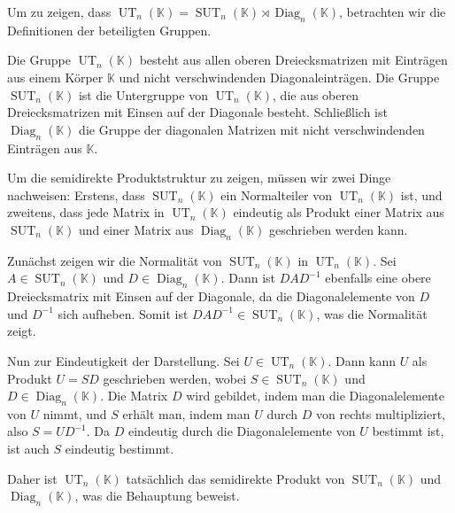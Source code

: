 Um zu zeigen, dass $\operatorname{UT}_n(\mathbb{K}) = \operatorname{SUT}_n(\mathbb{K}) \rtimes \operatorname{Diag}_n(\mathbb{K})$, betrachten wir die Definitionen der beteiligten Gruppen.

Die Gruppe $\operatorname{UT}_n(\mathbb{K})$ besteht aus allen oberen Dreiecksmatrizen mit Einträgen aus einem Körper $\mathbb{K}$ und nicht verschwindenden Diagonaleinträgen. Die Gruppe $\operatorname{SUT}_n(\mathbb{K})$ ist die Untergruppe von $\operatorname{UT}_n(\mathbb{K})$, die aus oberen Dreiecksmatrizen mit Einsen auf der Diagonale besteht. Schließlich ist $\operatorname{Diag}_n(\mathbb{K})$ die Gruppe der diagonalen Matrizen mit nicht verschwindenden Einträgen aus $\mathbb{K}$.

Um die semidirekte Produktstruktur zu zeigen, müssen wir zwei Dinge nachweisen: Erstens, dass $\operatorname{SUT}_n(\mathbb{K})$ ein Normalteiler von $\operatorname{UT}_n(\mathbb{K})$ ist, und zweitens, dass jede Matrix in $\operatorname{UT}_n(\mathbb{K})$ eindeutig als Produkt einer Matrix aus $\operatorname{SUT}_n(\mathbb{K})$ und einer Matrix aus $\operatorname{Diag}_n(\mathbb{K})$ geschrieben werden kann.

Zunächst zeigen wir die Normalität von $\operatorname{SUT}_n(\mathbb{K})$ in $\operatorname{UT}_n(\mathbb{K})$. Sei $A \in \operatorname{SUT}_n(\mathbb{K})$ und $D \in \operatorname{Diag}_n(\mathbb{K})$. Dann ist $DAD^{-1}$ ebenfalls eine obere Dreiecksmatrix mit Einsen auf der Diagonale, da die Diagonalelemente von $D$ und $D^{-1}$ sich aufheben. Somit ist $DAD^{-1} \in \operatorname{SUT}_n(\mathbb{K})$, was die Normalität zeigt.

Nun zur Eindeutigkeit der Darstellung. Sei $U \in \operatorname{UT}_n(\mathbb{K})$. Dann kann $U$ als Produkt $U = SD$ geschrieben werden, wobei $S \in \operatorname{SUT}_n(\mathbb{K})$ und $D \in \operatorname{Diag}_n(\mathbb{K})$. Die Matrix $D$ wird gebildet, indem man die Diagonalelemente von $U$ nimmt, und $S$ erhält man, indem man $U$ durch $D$ von rechts multipliziert, also $S = UD^{-1}$. Da $D$ eindeutig durch die Diagonalelemente von $U$ bestimmt ist, ist auch $S$ eindeutig bestimmt.

Daher ist $\operatorname{UT}_n(\mathbb{K})$ tatsächlich das semidirekte Produkt von $\operatorname{SUT}_n(\mathbb{K})$ und $\operatorname{Diag}_n(\mathbb{K})$, was die Behauptung beweist.